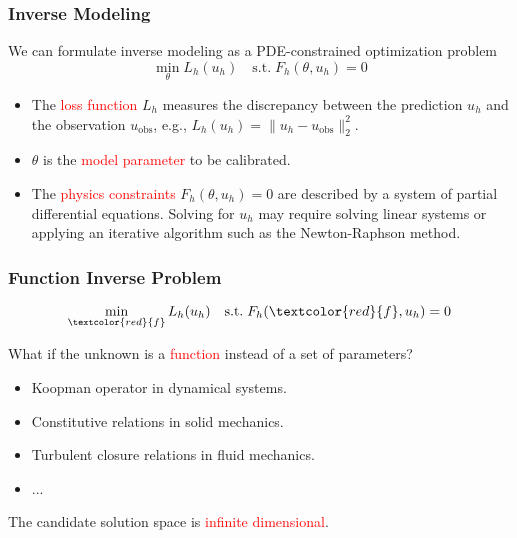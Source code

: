 \documentclass[usenames,dvipsnames]{beamer}
\begin{document}
\begin{frame}
	\frametitle{Inverse Modeling}
	We can formulate inverse modeling as a PDE-constrained optimization problem 
	\begin{equation*}
		\min_{\theta} L_h(u_h) \quad \mathrm{s.t.}\; F_h(\theta, u_h) = 0
	\end{equation*}
	\begin{itemize}
		\item The \textcolor{red}{loss function} $L_h$ measures the discrepancy between the prediction $u_h$ and the observation $u_{\mathrm{obs}}$, e.g., $L_h(u_h) = \|u_h - u_{\mathrm{obs}}\|_2^2$. 
		\item $\theta$ is the \textcolor{red}{model parameter} to be calibrated. 
		\item The \textcolor{red}{physics constraints} $F_h(\theta, u_h)=0$ are described by a system of partial differential equations. Solving for $u_h$ may require solving linear systems or applying an iterative algorithm such as the Newton-Raphson method. 
	\end{itemize}
\end{frame}

\begin{frame}
	\frametitle{Function Inverse Problem}
	
	\begin{equation*}
		\min_{\textcolor{red}{f}} L_h(u_h) \quad \mathrm{s.t.}\; F_h(\textcolor{red}{f}, u_h) = 0
	\end{equation*}
	
	What if the unknown is a \textcolor{red}{function} instead of a set of parameters?
\begin{itemize}
	\item Koopman operator in dynamical systems.
	\item Constitutive relations in solid mechanics. 
	\item Turbulent closure relations in fluid mechanics.
	\item ...
\end{itemize}

The candidate solution space is \textcolor{red}{infinite dimensional}.

\end{frame}
\end{document}

